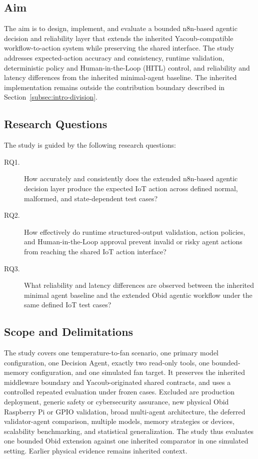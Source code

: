 \subsection{Aim}\label{subsec:intro-aim}

The aim is to design, implement, and evaluate a bounded n8n-based agentic
decision and reliability layer that extends the inherited Yacoub-compatible
workflow-to-action system while preserving the shared interface. The study
addresses expected-action accuracy and consistency, runtime validation,
deterministic policy and Human-in-the-Loop (HITL) control, and reliability and
latency differences from the inherited minimal-agent baseline. The inherited
implementation remains outside the contribution boundary described in
Section~\ref{subsec:intro-division}.

\subsection{Research Questions}\label{subsec:intro-rqs}

The study is guided by the following research questions:

\begin{description}
\item[RQ1.] How accurately and consistently does the extended n8n-based
agentic decision layer produce the expected IoT action across defined normal,
malformed, and state-dependent test cases?

\item[RQ2.] How effectively do runtime structured-output validation,
action policies, and Human-in-the-Loop approval prevent invalid or risky agent
actions from reaching the shared IoT action interface?

\item[RQ3.] What reliability and latency differences are observed
between the inherited minimal agent baseline and the extended Obid agentic
workflow under the same defined IoT test cases?
\end{description}

\subsection{Scope and Delimitations}\label{subsec:intro-scope}

The study covers one temperature-to-fan scenario, one primary model
configuration, one Decision Agent, exactly two read-only tools, one
bounded-memory configuration, and one simulated fan target. It preserves the
inherited middleware boundary and Yacoub-originated shared contracts, and uses a
controlled repeated evaluation under frozen cases. Excluded are production
deployment, generic safety or cybersecurity assurance, new physical Obid
Raspberry Pi or GPIO validation, broad multi-agent architecture, the deferred
validator-agent comparison, multiple models, memory strategies or devices,
scalability benchmarking, and statistical generalization. The study thus
evaluates one bounded Obid extension against one inherited comparator in one
simulated setting. Earlier physical evidence remains inherited context.

